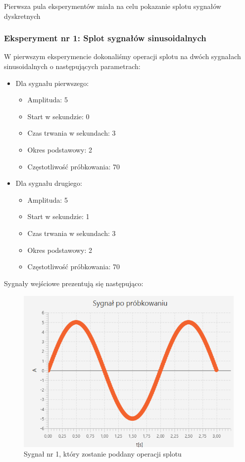 \documentclass[12pt]{article}
\begin{document}
Pierwsza pula eksperymentów miała na celu pokazanie splotu sygnałów dyskretnych

\subsubsection{Eksperyment nr 1: Splot sygnałów sinusoidalnych}

W pierwszym eksperymencie dokonaliśmy operacji splotu na dwóch sygnałach sinusoidalnych o następujących parametrach:
\begin{itemize}
    \item Dla sygnału pierwszego: 
    \begin{itemize}
        \item Amplituda: 5
        \item Start w sekundzie: 0
        \item Czas trwania w sekundach: 3
        \item Okres podstawowy: 2
        \item Częstotliwość próbkowania: 70
    \end{itemize}
    \item Dla sygnału drugiego:
    \begin{itemize}
        \item Amplituda: 5
        \item Start w sekundzie: 1
        \item Czas trwania w sekundach: 3
        \item Okres podstawowy: 2
        \item Częstotliwość próbkowania: 70
    \end{itemize}
\end{itemize}
Sygnały wejściowe prezentują się następująco:
\begin{figure}[H]
    \centering
	\includegraphics[width=\linewidth]{sygnal_po_probkowaniu_1.1.png}
    \caption{Sygnał nr 1, który zostanie poddany operacji splotu}
    \label{Sygnał_1.1}
\end{figure}
\end{document}
